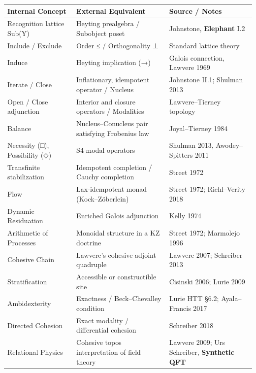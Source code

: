 \documentclass[11pt]{article}
\begin{document}
\begin{center}
\begin{tabular}{lll}
Internal Concept & External Equivalent & Source / Notes\\
\hline
Recognition lattice Sub(Y) & Heyting prealgebra / Subobject poset & Johnstone, \textbf{Elephant} I.2\\
Include / Exclude & Order ≤ / Orthogonality ⊥ & Standard lattice theory\\
Induce & Heyting implication (→) & Galois connection, Lawvere 1969\\
Iterate / Close & Inflationary, idempotent operator / Nucleus & Johnstone II.1; Shulman 2013\\
Open / Close adjunction & Interior and closure operators / Modalities & Lawvere–Tierney topology\\
Balance & Nucleus–Conucleus pair satisfying Frobenius law & Joyal–Tierney 1984\\
Necessity (□), Possibility (◇) & S4 modal operators & Shulman 2013, Awodey–Spitters 2011\\
Transfinite stabilization & Idempotent completion / Cauchy completion & Street 1972\\
Flow & Lax-idempotent monad (Kock–Zöberlein) & Street 1972; Riehl–Verity 2018\\
Dynamic Residuation & Enriched Galois adjunction & Kelly 1974\\
Arithmetic of Processes & Monoidal structure in a KZ doctrine & Street 1972; Marmolejo 1996\\
Cohesive Chain & Lawvere’s cohesive adjoint quadruple & Lawvere 2007; Schreiber 2013\\
Stratification & Accessible or constructible site & Cisinski 2006; Lurie 2009\\
Ambidexterity & Exactness / Beck–Chevalley condition & Lurie HTT §6.2; Ayala–Francis 2017\\
Directed Cohesion & Exact modality / differential cohesion & Schreiber 2018\\
Relational Physics & Cohesive topos interpretation of field theory & Lawvere 2009; Urs Schreiber, \textbf{Synthetic QFT}\\
\end{tabular}
\end{center}
\end{document}
